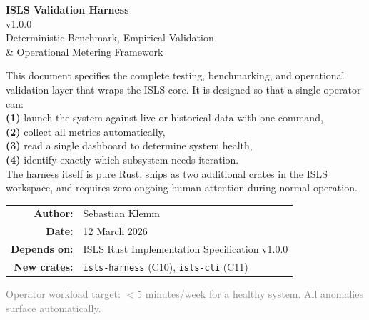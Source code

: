 \documentclass[10pt,a4paper]{article}
\begin{document}
\begin{titlepage}\centering\vspace*{1cm}
{\Huge\bfseries\color{sectioncolor}ISLS Validation Harness}\\[0.4cm]
{\LARGE\color{accent}v1.0.0}\\[0.3cm]
{\large\color{accentdark}Deterministic Benchmark, Empirical Validation\\
\& Operational Metering Framework}

\vspace{0.8cm}
\begin{tcolorbox}[colback=thmbg,colframe=thmborder,width=0.92\textwidth,arc=3pt]
\small\centering
This document specifies the complete testing, benchmarking, and operational validation
layer that wraps the ISLS core. It is designed so that a single operator can:\\[2pt]
\textbf{(1)} launch the system against live or historical data with one command,\\
\textbf{(2)} collect all metrics automatically,\\
\textbf{(3)} read a single dashboard to determine system health,\\
\textbf{(4)} identify exactly which subsystem needs iteration.\\[2pt]
The harness itself is pure Rust, ships as two additional crates in the ISLS workspace,
and requires zero ongoing human attention during normal operation.
\end{tcolorbox}

\vspace{0.6cm}
\begin{tabular}{rl}
\textbf{Author:} & Sebastian Klemm \\
\textbf{Date:} & 12 March 2026 \\
\textbf{Depends on:} & ISLS Rust Implementation Specification v1.0.0 \\
\textbf{New crates:} & \texttt{isls-harness} (C10), \texttt{isls-cli} (C11) \\
\end{tabular}
\vfill
{\scriptsize\textcolor{gray}{Operator workload target: $<$5 minutes/week for a healthy system. All anomalies surface automatically.}}
\end{titlepage}

\tableofcontents\newpage

\end{document}
